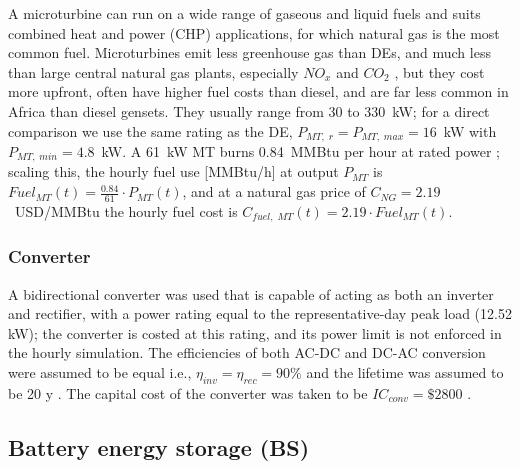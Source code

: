 \documentclass[final,3p,times]{elsarticle}
\begin{document}
A microturbine can run on a wide range of gaseous and liquid fuels and suits combined heat and power (CHP) applications, for which natural gas is the most common fuel. Microturbines emit less greenhouse gas than DEs, and much less than large central natural gas plants, especially $NO_x$ and $CO_2$ \cite{wu2014}, but they cost more upfront, often have higher fuel costs than diesel, and are far less common in Africa than diesel gensets. They usually range from 30 to 330~kW; for a direct comparison we use the same rating as the DE, $P_{MT,\; r} = P_{MT, \; max} = 16$~kW with $P_{MT,\;min} = 4.8$~kW. A 61~kW MT burns 0.84~MMBtu per hour at rated power \cite{chp_mt}; scaling this, the hourly fuel use [MMBtu/h] at output $P_{MT}$ is $Fuel_{MT}(t) = \frac{0.84}{61} \cdot P_{MT}(t)$, and at a natural gas price of $C_{NG} = 2.19$~USD/MMBtu \cite{ng_price} the hourly fuel cost is $C_{fuel,\;MT}(t) = 2.19 \cdot Fuel_{MT}(t)$.

\subsubsection{Converter}

A bidirectional converter was used that is capable of acting as both an inverter and rectifier, with a power rating equal to the representative-day peak load (12.52 kW); the converter is costed at this rating, and its power limit is not enforced in the hourly simulation. The efficiencies of both AC-DC and DC-AC conversion were assumed to be equal i.e., $\eta_{inv} = \eta_{rec} = 90\%$ \cite{ogunjuyigbe2016} and the lifetime was assumed to be 20 y \cite{moshi2016}. The capital cost of the converter was taken to be $IC_{conv} = \$2800$ \cite{conv_price}.

\subsection{Battery energy storage (BS) \label{sec:BS}}
\end{document}
